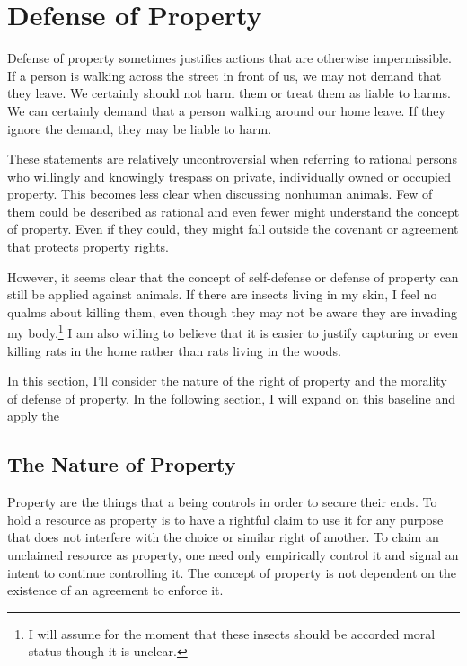 \documentclass[12pt]{book}
\begin{document}
\section{Defense of Property}

	Defense of property sometimes justifies actions that are otherwise
	impermissible. If a person is walking across the street in front of us, we
	may not demand that they leave. We certainly should not harm them or treat
	them as liable to harms.  We can certainly demand that a person walking
	around our home leave. If they ignore the demand, they may be liable to
	harm.

	These statements are relatively uncontroversial when referring to rational
	persons who willingly and knowingly trespass on private, individually owned
	or occupied property. This becomes less clear when discussing nonhuman
	animals. Few of them could be described as rational and even fewer might
	understand the concept of property. Even if they could, they might fall
	outside the covenant or agreement that protects property rights.

	However, it seems clear that the concept of self-defense or defense of
	property can still be applied against animals.  If there are insects living
	in my skin, I feel no qualms about killing them, even though they may not
	be aware they are invading my body.\footnote{I will assume for the moment
	that these insects should be accorded moral status though it is unclear.}
	I am also willing to believe that it is easier to justify capturing or even
	killing rats in the home rather than rats living in the woods.

	In this section, I’ll consider the nature of the right of property and the
	morality of defense of property. In the following section, I will expand
	on this baseline and apply the 

	\subsection{The Nature of Property}

	Property are the things that a being controls in order to secure their
	ends.  To hold a resource as property is to have a rightful claim to use it
	for any purpose that does not interfere with the choice or similar right of
	another.  To claim an unclaimed resource as property, one need only
	empirically control it and signal an intent to continue controlling it.
	The concept of property is not dependent on the existence of an agreement to
	enforce it.
\end{document}
